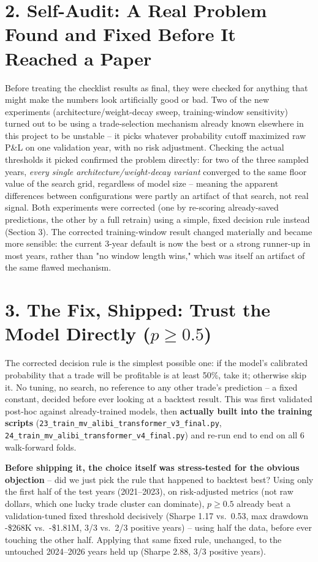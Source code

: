 \documentclass[11pt]{article}
\begin{document}
\section*{2. Self-Audit: A Real Problem Found and Fixed Before It Reached a Paper}
Before treating the checklist results as final, they were checked for anything that might make the numbers
look artificially good or bad. Two of the new experiments (architecture/weight-decay sweep, training-window
sensitivity) turned out to be using a trade-selection mechanism already known elsewhere in this project to be
unstable -- it picks whatever probability cutoff maximized raw P\&L on one validation year, with no risk
adjustment. Checking the actual thresholds it picked confirmed the problem directly: for two of the three
sampled years, \emph{every single architecture/weight-decay variant} converged to the same floor value of
the search grid, regardless of model size -- meaning the apparent differences between configurations were
partly an artifact of that search, not real signal. Both experiments were corrected (one by re-scoring
already-saved predictions, the other by a full retrain) using a simple, fixed decision rule instead (Section
3). The corrected training-window result changed materially and became more sensible: the current 3-year
default is now the best or a strong runner-up in most years, rather than "no window length wins," which was
itself an artifact of the same flawed mechanism.

\section*{3. The Fix, Shipped: Trust the Model Directly ($p \ge 0.5$)}
The corrected decision rule is the simplest possible one: if the model's calibrated probability that a trade
will be profitable is at least 50\%, take it; otherwise skip it. No tuning, no search, no reference to any
other trade's prediction -- a fixed constant, decided before ever looking at a backtest result. This was
first validated post-hoc against already-trained models, then \textbf{actually built into the training
scripts} (\texttt{23\_train\_mv\_alibi\_transformer\_v3\_final.py},
\texttt{24\_train\_mv\_alibi\_transformer\_v4\_final.py}) and re-run end to end on all 6 walk-forward folds.

\textbf{Before shipping it, the choice itself was stress-tested for the obvious objection} -- did we just
pick the rule that happened to backtest best? Using only the first half of the test years (2021--2023), on
risk-adjusted metrics (not raw dollars, which one lucky trade cluster can dominate), $p\ge0.5$ already beat a
validation-tuned fixed threshold decisively (Sharpe 1.17 vs.\ 0.53, max drawdown -\$268K vs.\ -\$1.81M, 3/3
vs.\ 2/3 positive years) -- using half the data, before ever touching the other half. Applying that same
fixed rule, unchanged, to the untouched 2024--2026 years held up (Sharpe 2.88, 3/3 positive years).
\end{document}
